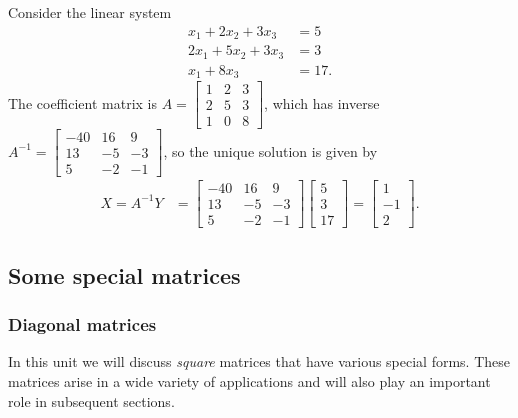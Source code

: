 \documentclass[12pt,letterpaper,reqno]{article}
\numberwithin{equation}{section}
\newcommand{\ti}[1]{\textit{#1}}
\begin{document}
\begin{example}
Consider the linear system
\begin{align*}
	x_1+2x_2+3x_3&=5 \\
	2x_1+5x_2+3x_3&=3 \\
	x_1+8x_3&=17.
\end{align*}
The coefficient matrix is $A=\begin{bmatrix}
		1 & 2 & 3 \\ 2 & 5 & 3 \\ 1 & 0 & 8
	\end{bmatrix}$, which has inverse $A^{-1}=\begin{bmatrix}
		-40 & 16 & 9 \\ 13 & -5 & -3 \\ 5 & -2 & -1
	\end{bmatrix}$, so the unique solution is given by
	\begin{align*}
		X=A^{-1}Y&=\begin{bmatrix}
		-40 & 16 & 9 \\ 13 & -5 & -3 \\ 5 & -2 & -1
	\end{bmatrix}\begin{bmatrix}
		5 \\ 3 \\ 17
	\end{bmatrix}=\begin{bmatrix}
		1 \\ -1 \\2
	\end{bmatrix}.
	\end{align*}	
\end{example}

\subsection{Some special matrices}
\subsubsection{Diagonal matrices}
In this unit we will discuss \ti{square} matrices that have various special forms. These matrices arise in a wide variety of applications and will also play an important role in subsequent sections.
\end{document}
